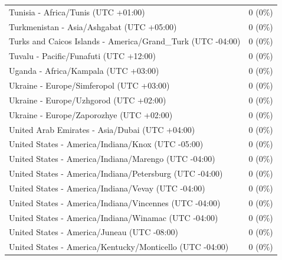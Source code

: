 \begin{appendix}
\begin{table}
{\begin{tabular}[t]{ll}
\hspace{1em}Tunisia - Africa/Tunis (UTC +01:00) & 0 (0\%)\\
\addlinespace
\hspace{1em}Turkmenistan - Asia/Ashgabat (UTC +05:00) & 0 (0\%)\\
\hspace{1em}Turks and Caicos Islands - America/Grand\_Turk (UTC -04:00) & 0 (0\%)\\
\hspace{1em}Tuvalu - Pacific/Funafuti (UTC +12:00) & 0 (0\%)\\
\hspace{1em}Uganda - Africa/Kampala (UTC +03:00) & 0 (0\%)\\
\hspace{1em}Ukraine - Europe/Simferopol (UTC +03:00) & 0 (0\%)\\
\addlinespace
\hspace{1em}Ukraine - Europe/Uzhgorod (UTC +02:00) & 0 (0\%)\\
\hspace{1em}Ukraine - Europe/Zaporozhye (UTC +02:00) & 0 (0\%)\\
\hspace{1em}United Arab Emirates - Asia/Dubai (UTC +04:00) & 0 (0\%)\\
\hspace{1em}United States - America/Indiana/Knox (UTC -05:00) & 0 (0\%)\\
\hspace{1em}United States - America/Indiana/Marengo (UTC -04:00) & 0 (0\%)\\
\addlinespace
\hspace{1em}United States - America/Indiana/Petersburg (UTC -04:00) & 0 (0\%)\\
\hspace{1em}United States - America/Indiana/Vevay (UTC -04:00) & 0 (0\%)\\
\hspace{1em}United States - America/Indiana/Vincennes (UTC -04:00) & 0 (0\%)\\
\hspace{1em}United States - America/Indiana/Winamac (UTC -04:00) & 0 (0\%)\\
\hspace{1em}United States - America/Juneau (UTC -08:00) & 0 (0\%)\\
\addlinespace
\hspace{1em}United States - America/Kentucky/Monticello (UTC -04:00) & 0 (0\%)\\

\end{tabular}}
\end{table}
\end{appendix}
